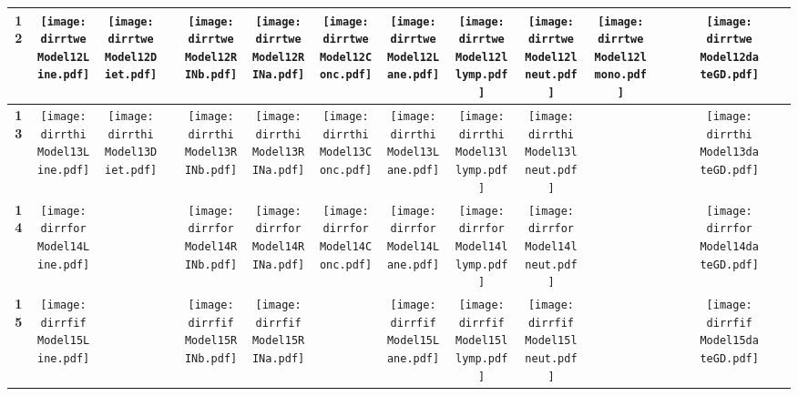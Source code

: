 \documentclass[landscape]{article}
\def \dirrtwe {U:/R/RA/Data/Reanalysis Data/resultcbc/Model12.Line.Diet.RINb.RINa.Conc.Lane.llymp.lneut.lmono.dateGD/}
\def \dirrthi {U:/R/RA/Data/Reanalysis Data/resultcbc/Model13.Line.Diet.RINb.RINa.Conc.Lane.llymp.lneut.dateGD/}
\def \dirrfor{U:/R/RA/Data/Reanalysis Data/resultcbc/Model14.Line.RINb.RINa.Conc.Lane.llymp.lneut.dateGD/}
\def \dirrfif{U:/R/RA/Data/Reanalysis Data/resultcbc/Model15.Line.RINb.RINa.Lane.llymp.lneut.dateGD/}
\begin{document}
\begin{table}
\begin{tabular}{ccccccccccccccccc}
     {\Huge \textbf{12}} 
      &\texttt{[image: \\dirrtwe Model12Line.pdf]}
      &\texttt{[image: \\dirrtwe Model12Diet.pdf]}
      &
      &\texttt{[image: \\dirrtwe Model12RINb.pdf]}
      &\texttt{[image: \\dirrtwe Model12RINa.pdf]}
      &\texttt{[image: \\dirrtwe Model12Conc.pdf]}
      &\texttt{[image: \\dirrtwe Model12Lane.pdf]}
      &\texttt{[image: \\dirrtwe Model12llymp.pdf]}
      &\texttt{[image: \\dirrtwe Model12lneut.pdf]}
      &\texttt{[image: \\dirrtwe Model12lmono.pdf]}
      &
      &
      &
      &\texttt{[image: \\dirrtwe Model12dateGD.pdf]}
     \\
     \hline
     
     {\Huge \textbf{13}} 
      &\texttt{[image: \\dirrthi Model13Line.pdf]}
      &\texttt{[image: \\dirrthi Model13Diet.pdf]}
      &
      &\texttt{[image: \\dirrthi Model13RINb.pdf]}
      &\texttt{[image: \\dirrthi Model13RINa.pdf]}
      &\texttt{[image: \\dirrthi Model13Conc.pdf]}
      &\texttt{[image: \\dirrthi Model13Lane.pdf]}
      &\texttt{[image: \\dirrthi Model13llymp.pdf]}
      &\texttt{[image: \\dirrthi Model13lneut.pdf]}
      &
      &
      &
      &
      &\texttt{[image: \\dirrthi Model13dateGD.pdf]}
     \\
     \hline
     

      {\Huge \textbf{14}} 
      &\texttt{[image: \\dirrfor Model14Line.pdf]}
      &
      &
      &\texttt{[image: \\dirrfor Model14RINb.pdf]}
      &\texttt{[image: \\dirrfor Model14RINa.pdf]}
      &\texttt{[image: \\dirrfor Model14Conc.pdf]}
      &\texttt{[image: \\dirrfor Model14Lane.pdf]}
      &\texttt{[image: \\dirrfor Model14llymp.pdf]}
      &\texttt{[image: \\dirrfor Model14lneut.pdf]}
      &
      &
      &
      &
      &\texttt{[image: \\dirrfor Model14dateGD.pdf]}
     \\
     \hline
     
     {\Huge \textbf{15}} 
      &\texttt{[image: \\dirrfif Model15Line.pdf]}
      &
      &
      &\texttt{[image: \\dirrfif Model15RINb.pdf]}
      &\texttt{[image: \\dirrfif Model15RINa.pdf]}
      &
      &\texttt{[image: \\dirrfif Model15Lane.pdf]}
      &\texttt{[image: \\dirrfif Model15llymp.pdf]}
      &\texttt{[image: \\dirrfif Model15lneut.pdf]}
      &
      &
      &
      &
      &\texttt{[image: \\dirrfif Model15dateGD.pdf]}
     \\
     \hline
     

\end{tabular}
\end{table}
\end{document}
